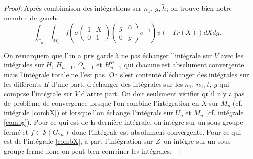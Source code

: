 \documentclass{amsart}
\begin{document}
\begin{proof}
Après combinaison des intégrations sur $n_1$, $g$, $\widetilde{h}$; on trouve bien notre membre de gauche
\begin{equation}
\int_{G_n} \int_{M_n}  f\left(\sigma \begin{pmatrix}
1 & X \\
0 & 1
\end{pmatrix} \begin{pmatrix}
g & 0 \\
0 & g
\end{pmatrix} \sigma^{-1} \right) \psi(-Tr(X))  dX dg.
\end{equation}

On remarquera que l'on a pris garde à ne pas échanger l'intégrale sur $V$ avec les intégrales sur $\widetilde{H}$, $H_{n-1}$, $\widetilde{\Omega}_{n-1}$ et $H^P_{n-1}$ qui chacune est absolument convergente mais l'intégrale totale ne l'est pas. On s'est contenté d'échanger des intégrales sur les différents $H$ d'une part, d'échanger des intégrales sur les $n_1$, $n_2$, $t$, $y$ qui compose l'intégrale sur $V$ d'autre part. On doit seulement vérifier qu'il n'y a pas de problème de convergence lorsque l'on combine l'intégration en $X$ sur $M_n$ (cf. intégrale \ref{combX}) et lorsque l'on échange l'intégrale sur $U_n$ et $M_n$ (cf. intégrale \ref{combg}). Pour ce qui est de la dernière intégrale, on intègre sur un sous-groupe fermé  et $f \in \mathcal{S}(G_{2n})$ donc l'intégrale est absolument convergente. Pour ce qui est de l'intégrale \ref{combX}, à part l'intégration sur $\widetilde{Z}$, on intègre sur un sous-groupe fermé donc on peut bien combiner les intégrales.


\end{proof}
\end{document}
